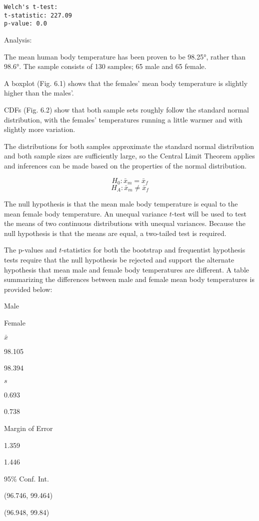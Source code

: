 \documentclass[11pt]{article}
\begin{document}
    \begin{Verbatim}[commandchars=\\\{\}]
Welch's t-test:
t-statistic: 227.09
p-value: 0.0

    \end{Verbatim}

    Analysis:

The mean human body temperature has been proven to be 98.25°, rather
than 98.6°. The sample consists of 130 samples; 65 male and 65 female.

A boxplot (Fig. 6.1) shows that the females' mean body temperature is
slightly higher than the males'.

CDFs (Fig. 6.2) show that both sample sets roughly follow the standard
normal distribution, with the females' temperatures running a little
warmer and with slightly more variation.

The distributions for both samples approximate the standard normal
distribution and both sample sizes are sufficiently large, so the
Central Limit Theorem applies and inferences can be made based on the
properties of the normal distribution.

\[H_0: \bar x_m = \bar x_f\] \[H_A: \bar x_m \neq \bar x_f\]

The null hypothesis is that the mean male body temperature is equal to
the mean female body temperature. An unequal variance \(t\)-test will be
used to test the means of two continuous distributions with unequal
variances. Because the null hypothesis is that the means are equal, a
two-tailed test is required.

The p-values and \(t\)-statistics for both the bootstrap and frequentist
hypothesis tests require that the null hypothesis be rejected and
support the alternate hypothesis that mean male and female body
temperatures are different. A table summarizing the differences between
male and female mean body temperatures is provided below:

Male

Female

\(\bar x\)

98.105

98.394

\(s\)

0.693

0.738

Margin of Error

1.359

1.446

95\% Conf. Int.

(96.746, 99.464)

(96.948, 99.84)


    
    
    
    
\end{document}

